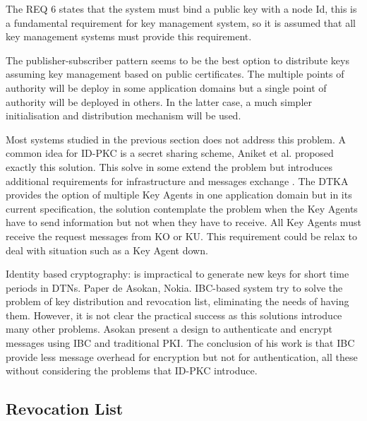The REQ 6 states that the system must bind a public key with a node Id, this is a fundamental requirement for key management system, so it is assumed that all key management systems must provide this requirement. 

The publisher-subscriber pattern seems to be the best option to distribute keys assuming key management based on public certificates. The multiple points of authority will be deploy in some application domains but a single point of authority will be deployed in others. In the latter case, a much simpler initialisation and distribution mechanism will be used. 


Most systems studied in the previous section does not address this problem. A common idea for ID-PKC is a secret sharing scheme, Aniket {et al.} \cite{kate2007anonymity} proposed exactly this solution. This solve in some extend the problem but introduces additional requirements for infrastructure and messages exchange \cite{al2003certificateless}. The DTKA provides the option of multiple Key Agents in one application domain but in its current specification, the solution contemplate the problem when the Key Agents have to send information but not when they have to receive. All Key Agents must receive the request messages from KO or KU. This requirement could be relax to deal with situation such as a Key Agent down.    


Identity based cryptography: is impractical to generate new keys for short time periods in DTNs.
Paper de Asokan, Nokia. IBC-based system try to solve the problem of key distribution and revocation list, eliminating the needs of having them. However, it is not clear the practical success as this solutions introduce many other problems. Asokan \cite{asokan2007towards} present a design to authenticate and encrypt messages using IBC and traditional PKI. The conclusion of his work is that IBC provide less message overhead for encryption but not for authentication, all these without considering the problems that ID-PKC introduce. 

\subsection{Revocation List}